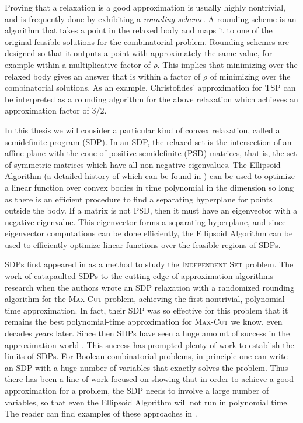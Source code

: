Proving that a relaxation is a good approximation is usually highly nontrivial, and is frequently done by exhibiting a \emph{rounding scheme}. A rounding scheme is an  algorithm that takes a point in the relaxed body and maps it to one of the original feasible solutions for the combinatorial problem. Rounding schemes are designed so that it outputs a point with approximately the same value, for example within a multiplicative factor of $\rho$. This implies that minimizing over the relaxed body gives an answer that is within a factor of $\rho$ of minimizing over the combinatorial solutions. As an example, Christofides' approximation for \textsc{TSP} \cite{Chri76} can be interpreted as a rounding algorithm for the above relaxation which achieves an approximation factor of $3/2$.

In this thesis we will consider a particular kind of convex relaxation, called a semidefinite program (SDP). In an SDP, the relaxed set is the intersection of an affine plane with the cone of positive semidefinite (PSD) matrices, that is, the set of symmetric matrices which have all non-negative eigenvalues. The Ellipsoid Algorithm (a detailed history of which can be found in \cite{Akg84}) can be used to optimize a linear function over convex bodies in time polynomial in the dimension so long as there is an efficient procedure to find a separating hyperplane for points outside the body. If a matrix is not PSD, then it must have an eigenvector with a negative eigenvalue. This eigenvector forms a separating hyperplane, and since eigenvector computations can be done efficiently, the Ellipsoid Algorithm can be used to efficiently optimize linear functions over the feasible regions of SDPs. 

SDPs first appeared in \cite{Lovasz79} as a method to study the \textsc{Independent Set} problem. The work of \cite{GW95} catapaulted SDPs to the cutting edge of approximation algorithms research when the authors wrote an SDP relaxation with a randomized rounding algorithm for the \textsc{Max Cut} problem, achieving the first nontrivial, polynomial-time approximation. In fact, their SDP was so effective for this problem that it remains the best polynomial-time approximation for \textsc{Max-Cut} we know, even decades years later. Since then SDPs have seen a huge amount of success in the approximation world \cite{FJ97,HZ99,PW07,Ragh08,Chlam07,CMM09,Kar09,ARV09,TS15}. This success has prompted plenty of work to establish the limits of SDPs. For Boolean combinatorial problems, in principle one can write an SDP with a huge number of variables that exactly solves the problem. Thus there has been a line of work focused on showing that in order to achieve a good approximation for a problem, the SDP needs to involve a large number of variables, so that even the Ellipsoid Algorithm will not run in polynomial time. The reader can find examples of these approaches in \cite{RS09, BPZ15, LRS15, BCVVZ12, BDP15}.

